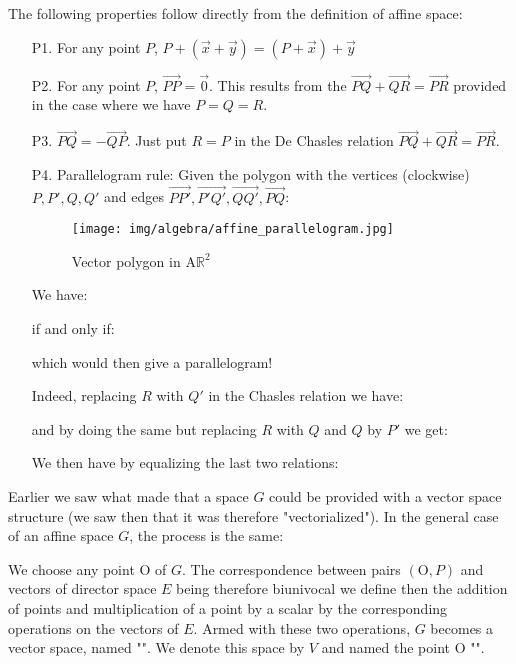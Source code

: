 	The following properties follow directly from the definition of affine space:
	\begin{enumerate}
		\item[P1.] For any point $P$, $P+(\vec{x}+\vec{y})=(P+\vec{x})+\vec{y}$
		
		\item[P2.] For any point $P$, $\overrightarrow{PP}=\vec{0}$. This results from the $\overrightarrow{PQ}+\overrightarrow{QR}=\overrightarrow{PR}$ provided in the case where we have $P=Q=R$.
		
		\item[P3.] $\overrightarrow{PQ}=-\overrightarrow{QP}$. Just put $R = P$ in the De Chasles relation $\overrightarrow{PQ}+\overrightarrow{QR}=\overrightarrow{PR}$.
		
		\item[P4.] Parallelogram rule:
		Given the polygon with the vertices (clockwise) $P,P',Q,Q'$ and edges $\overrightarrow{PP'},\overrightarrow{P'Q'},\overrightarrow{QQ'},\overrightarrow{PQ}$:
		\begin{figure}[H]
			\centering
			\texttt{[image: img/algebra/affine\_parallelogram.jpg]}
			\caption{Vector polygon in $\text{A}\mathbb{R}^2$}
		\end{figure}
		We have:
		
		if and only if:
		
		which would then give a parallelogram!
	
		Indeed, replacing $R$ with $Q'$ in the Chasles relation we have:
		
		and by doing the same but replacing $R$ with $Q$ and $Q$ by $P'$ we get:
		
		We then have by equalizing the last two relations:
		
	\end{enumerate}
	Earlier we saw what made that a space $G$ could be provided with a vector space structure (we saw then that it was therefore "vectorialized"). In the general case of an affine space $G$, the process is the same:
	
	We choose any point $\text{O}$ of $G$. The correspondence between pairs $(\text{O},P)$ and vectors of director space $E$ being therefore biunivocal we define then the addition of points and multiplication of a point by a scalar by the corresponding operations on the vectors of $E$. Armed with these two operations, $G$ becomes a vector space, named "". We denote this space by $V$ and named the point $\text{O}$ "".
	
